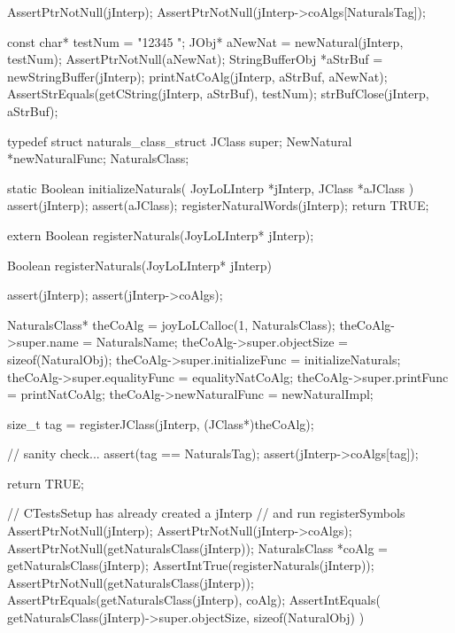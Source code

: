 
\startCTest
  AssertPtrNotNull(jInterp);
  AssertPtrNotNull(jInterp->coAlgs[NaturalsTag]);

  const char* testNum = "12345 ";
  JObj* aNewNat = newNatural(jInterp, testNum);
  AssertPtrNotNull(aNewNat);
  StringBufferObj *aStrBuf = newStringBuffer(jInterp);
  printNatCoAlg(jInterp, aStrBuf, aNewNat);
  AssertStrEquals(getCString(jInterp, aStrBuf), testNum);
  strBufClose(jInterp, aStrBuf);
\stopCTest
\stopTestCase
\stopTestSuite

\startTestSuite[registerSymbols]

\startCHeader
typedef struct naturals_class_struct {
  JClass super;
  NewNatural *newNaturalFunc;
} NaturalsClass;
\stopCHeader

\startCCode
static Boolean initializeNaturals(
  JoyLoLInterp *jInterp,
  JClass   *aJClass
) {
  assert(jInterp);
  assert(aJClass);
  registerNaturalWords(jInterp);
  return TRUE;
}
\stopCCode

\startCHeader
extern Boolean registerNaturals(JoyLoLInterp* jInterp);
\stopCHeader
{}

\startCCode
Boolean registerNaturals(JoyLoLInterp* jInterp) {
  assert(jInterp);
  assert(jInterp->coAlgs);
  
  NaturalsClass* theCoAlg        = joyLoLCalloc(1, NaturalsClass);
  theCoAlg->super.name           = NaturalsName;
  theCoAlg->super.objectSize     = sizeof(NaturalObj);
  theCoAlg->super.initializeFunc = initializeNaturals;
  theCoAlg->super.equalityFunc   = equalityNatCoAlg;
  theCoAlg->super.printFunc      = printNatCoAlg;
  theCoAlg->newNaturalFunc       = newNaturalImpl;

  size_t tag =
    registerJClass(jInterp, (JClass*)theCoAlg);
  
  // sanity check...
  assert(tag == NaturalsTag);
  assert(jInterp->coAlgs[tag]);

  return TRUE;
}
\stopCCode


\startCTest
  // CTestsSetup has already created a jInterp
  // and run registerSymbols
  AssertPtrNotNull(jInterp);
  AssertPtrNotNull(jInterp->coAlgs);
  AssertPtrNotNull(getNaturalsClass(jInterp));
  NaturalsClass *coAlg = getNaturalsClass(jInterp);
  AssertIntTrue(registerNaturals(jInterp));
  AssertPtrNotNull(getNaturalsClass(jInterp));
  AssertPtrEquals(getNaturalsClass(jInterp), coAlg);
  AssertIntEquals(
    getNaturalsClass(jInterp)->super.objectSize,
    sizeof(NaturalObj)
  )
\stopCTest
\stopTestCase
\stopTestSuite
